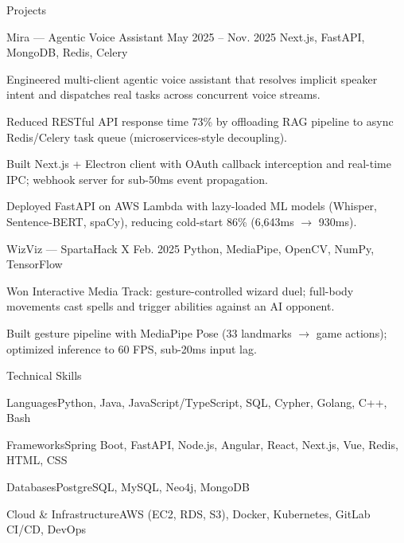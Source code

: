 \documentclass[
	11pt
]{../../../resume}
\begin{document}
	\begin{rSection}{P}{rojects}
		\begin{rSectionEntry}
			{Mira --- Agentic Voice Assistant}
			{May 2025 -- Nov. 2025}
			{}
			{Next.js, FastAPI, MongoDB, Redis, Celery}
			{}

			\item Engineered multi-client agentic voice assistant that resolves implicit speaker intent and dispatches real tasks across concurrent voice streams.
			\item Reduced RESTful API response time 73\% by offloading RAG pipeline to async Redis/Celery task queue (microservices-style decoupling).
			\item Built Next.js + Electron client with OAuth callback interception and real-time IPC; webhook server for sub-50ms event propagation.
			\item Deployed FastAPI on AWS Lambda with lazy-loaded ML models (Whisper, Sentence-BERT, spaCy), reducing cold-start 86\% (6{,}643ms $\rightarrow$ 930ms).
		\end{rSectionEntry}

		\begin{rSectionEntry}
			{WizViz --- SpartaHack X}
			{Feb. 2025}
			{}
			{Python, MediaPipe, OpenCV, NumPy, TensorFlow}
			{}

			\item Won Interactive Media Track: gesture-controlled wizard duel; full-body movements cast spells and trigger abilities against an AI opponent.
			\item Built gesture pipeline with MediaPipe Pose (33 landmarks $\rightarrow$ game actions); optimized inference to 60 FPS, sub-20ms input lag.
		\end{rSectionEntry}
	\end{rSection}

	\begin{rSection}{T}{echnical Skills}
		\begin{rSet}{Languages}{Python, Java, JavaScript/TypeScript, SQL, Cypher, Golang, C++, Bash}
		\end{rSet}
		\begin{rSet}{Frameworks}{Spring Boot, FastAPI, Node.js, Angular, React, Next.js, Vue, Redis, HTML, CSS}
		\end{rSet}
		\begin{rSet}{Databases}{PostgreSQL, MySQL, Neo4j, MongoDB}
		\end{rSet}
		\begin{rSet}{Cloud \& Infrastructure}{AWS (EC2, RDS, S3), Docker, Kubernetes, GitLab CI/CD, DevOps}
		\end{rSet}
	\end{rSection}
\end{document}
